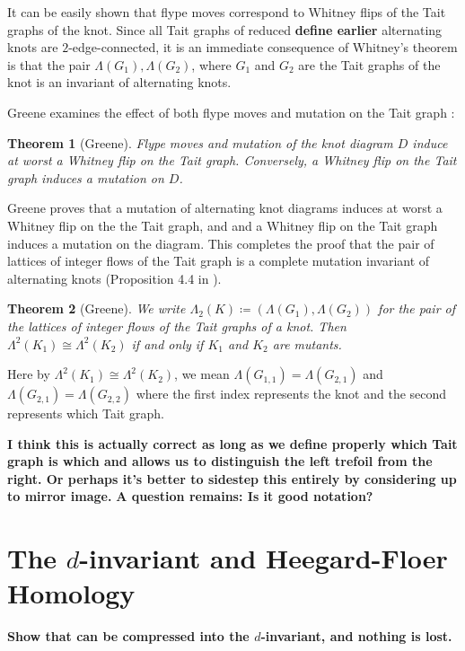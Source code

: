 \documentclass[12pt]{report}
\newcommand{\notered}[1]{{\color{Red} \textbf{#1}}}
\newcommand{\notegreen}[1]{{\color{Green} \textbf{#1}}}
\newtheorem*{theorem}{Theorem}
\begin{document}
It can be easily shown that flype moves correspond to Whitney flips of the Tait graphs of the knot. Since all Tait graphs of reduced \notered{define earlier} alternating knots are $2$-edge-connected, it is an immediate consequence of Whitney's theorem is that the pair $\Lambda(G_{1}), \Lambda(G_{2})$, where $G_{1}$ and $G_{2}$ are the Tait graphs of the knot is an invariant of alternating knots.

Greene examines the effect of both flype moves and mutation on the Tait graph \cite[Proposition 4.5]{lattices-graphs-mutation}:

\begin{theorem}[Greene]
	Flype moves and mutation of the knot diagram $D$ induce at worst a Whitney flip on the Tait graph. Conversely, a Whitney flip on the Tait graph induces a mutation on $D$.
\end{theorem}

Greene proves that a mutation of alternating knot diagrams induces at worst a Whitney flip on the the Tait graph, and and a Whitney flip on the Tait graph induces a mutation on the diagram. This completes the proof that the pair of lattices of integer flows of the Tait graph is a complete mutation invariant of alternating knots (Proposition 4.4 in \cite{lattices-graphs-mutation}).

\begin{theorem}[Greene]
We write $\Lambda_{2}(K) \coloneq \left( \Lambda(G_{1}), \Lambda(G_{2}) \right)$ for the pair of the lattices of integer flows of the Tait graphs of a knot. Then
$\Lambda^{2}(K_{1}) \cong \Lambda^{2}(K_{2})$ if and only if $K_{1}$ and $K_{2}$ are mutants.
\end{theorem}

Here by $\Lambda^{2}(K_{1}) \cong \Lambda^{2}(K_{2})$, we mean $\Lambda(G_{1,1}) = \Lambda(G_{2, 1})$ and $\Lambda(G_{2,1}) = \Lambda(G_{2, 2})$ where the first index represents the knot and the second represents which Tait graph.

\notegreen{I think this is actually correct as long as we define properly which Tait graph is which and allows us to distinguish the left trefoil from the right. Or perhaps it's better to sidestep this entirely by considering up to mirror image.} \notered{A question remains: Is it good notation?}


\section{\notegreen{The $d$-invariant and Heegard-Floer Homology}}
\notegreen{Show that can be compressed into the $d$-invariant, and nothing is lost.}
\end{document}
